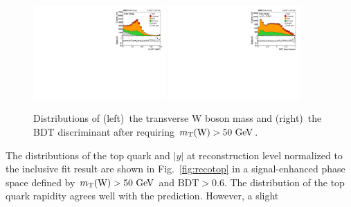 \documentclass[12pt]{article}
\begin{document}
\begin{figure}[th]
\begin{center}
\includegraphics[width=0.45\textwidth]{figures/fit/reco_mtw.pdf}\hspace{0.05\textwidth}
\includegraphics[width=0.45\textwidth]{figures/fit/reco_BDT.pdf}
\end{center}

\caption{\label{fig:mtwbdt}Distributions of (left)~the transverse W boson mass and (right)~the BDT discriminant after requiring $m_{\mathrm{T}}(\mathrm{W})>50~\mathrm{GeV}$.}
\end{figure}

The distributions of the top quark \pt and $|y|$ at reconstruction level normalized to the inclusive fit result are shown in Fig.~\ref{fig:recotop} in a signal-enhanced phase space defined by $m_{\mathrm{T}}(\mathrm{W})>50~\mathrm{GeV}$ and $\mathrm{BDT}>0.6$. The distribution of the top quark rapidity agrees well with the prediction. However, a slight 
\end{document}
